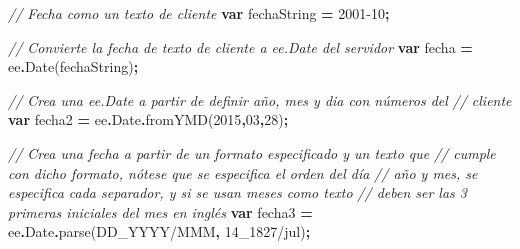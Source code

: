 \documentclass[
  12pt,
  letterpaper,
  twoside]{book}
\newenvironment{Shaded}{\begin{snugshade}}{\end{snugshade}}
\newcommand{\AttributeTok}[1]{\textcolor[rgb]{0.77,0.63,0.00}{#1}}
\newcommand{\CommentTok}[1]{\textcolor[rgb]{0.56,0.35,0.01}{\textit{#1}}}
\newcommand{\DecValTok}[1]{\textcolor[rgb]{0.00,0.00,0.81}{#1}}
\newcommand{\FunctionTok}[1]{\textcolor[rgb]{0.00,0.00,0.00}{#1}}
\newcommand{\KeywordTok}[1]{\textcolor[rgb]{0.13,0.29,0.53}{\textbf{#1}}}
\newcommand{\NormalTok}[1]{#1}
\newcommand{\OperatorTok}[1]{\textcolor[rgb]{0.81,0.36,0.00}{\textbf{#1}}}
\newcommand{\StringTok}[1]{\textcolor[rgb]{0.31,0.60,0.02}{#1}}
\begin{document}
\begin{Shaded}
\begin{Highlighting}[]
\CommentTok{// Fecha como un texto de cliente}
\KeywordTok{var}\NormalTok{ fechaString }\OperatorTok{=} \StringTok{\textquotesingle{}2001{-}10\textquotesingle{}}\OperatorTok{;}

\CommentTok{// Convierte la fecha de texto de cliente a ee.Date del servidor    }
\KeywordTok{var}\NormalTok{ fecha }\OperatorTok{=}\NormalTok{ ee}\OperatorTok{.}\FunctionTok{Date}\NormalTok{(fechaString)}\OperatorTok{;}  

\CommentTok{// Crea una ee.Date a partir de definir año, mes y dia con números del }
\CommentTok{// cliente           }
\KeywordTok{var}\NormalTok{ fecha2 }\OperatorTok{=}\NormalTok{ ee}\OperatorTok{.}\AttributeTok{Date}\OperatorTok{.}\FunctionTok{fromYMD}\NormalTok{(}\DecValTok{2015}\OperatorTok{,}\DecValTok{03}\OperatorTok{,}\DecValTok{28}\NormalTok{)}\OperatorTok{;} 
   
\CommentTok{// Crea una fecha a partir de un formato especificado y un texto que }
\CommentTok{// cumple con dicho formato, nótese que se especifica el orden del día }
\CommentTok{// año y mes, se especifica cada separador, y si se usan meses como texto}
\CommentTok{// deben ser las 3 primeras iniciales del mes en inglés}
\KeywordTok{var}\NormalTok{ fecha3 }\OperatorTok{=}\NormalTok{ ee}\OperatorTok{.}\AttributeTok{Date}\OperatorTok{.}\FunctionTok{parse}\NormalTok{(}\StringTok{\textquotesingle{}DD\_YYYY/MMM\textquotesingle{}}\OperatorTok{,} \StringTok{\textquotesingle{}14\_1827/jul\textquotesingle{}}\NormalTok{)}\OperatorTok{;} 
\end{Highlighting}
\end{Shaded}
\end{document}
